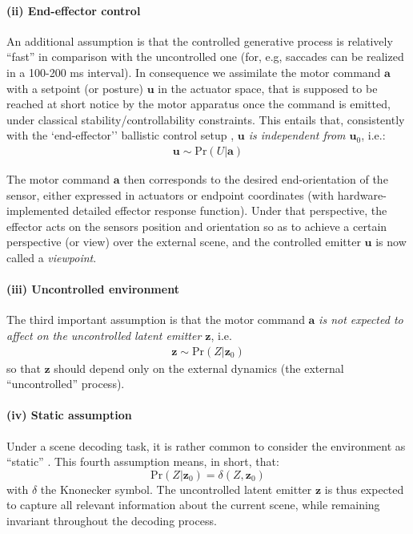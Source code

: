\documentclass[12pt,twoside,openright]{article}
\begin{document}
\paragraph{(ii) End-effector control}
An additional assumption is that the controlled generative process is relatively ``fast'' in comparison with the uncontrolled one
(for, e.g, saccades can be realized in a 100-200 ms interval). 
In consequence we assimilate the motor command $\boldsymbol{a}$ with a setpoint (or posture) $\boldsymbol{u}$ in the actuator space, that is supposed to be reached 
at short notice by the motor apparatus once the command is emitted, under classical stability/controllability constraints.
This entails that, consistently with the `end-effector'' ballistic control setup \cite{mussa2004neural},  \emph{$\boldsymbol{u}$ is independent from $\boldsymbol{u}_0$},
i.e.:
\begin{align*}
\boldsymbol{u}\sim\text{Pr}(U|\boldsymbol{a})
\end{align*}

The motor command $\boldsymbol{a}$ then corresponds to the desired end-orientation of the sensor,
either expressed in actuators or endpoint coordinates (with hardware-implemented detailed effector response function).  
Under that perspective, the effector acts on the sensors position and orientation so as to achieve a certain perspective (or view) over the external scene, and the controlled emitter $\boldsymbol{u}$ is now called a \emph{viewpoint}. 

\paragraph{(iii) Uncontrolled environment}
The third important assumption is that the motor command $\boldsymbol{a}$ \emph{is not expected to affect on the uncontrolled latent emitter $\boldsymbol{z}$}, i.e.
\begin{align*}
\boldsymbol{z} \sim \text{Pr}(Z|\boldsymbol{z}_0)
\end{align*}
so that $\boldsymbol{z}$ should depend only on the external dynamics (the external ``uncontrolled'' process).

\paragraph{(iv) Static assumption}
Under a scene decoding  task, %
it is rather common to consider the environment as ``static'' \cite{butko2010infomax}. This fourth assumption means, in short, that:
$$\text{Pr}(Z|\boldsymbol{z}_0) = \delta(Z, \boldsymbol{z}_0)$$ 
with $\delta$ the Knonecker symbol. 
The uncontrolled latent emitter $\boldsymbol{z}$ is thus expected to capture all relevant information about the current scene, while remaining invariant throughout the decoding process.
\end{document}
